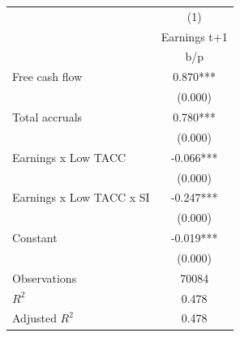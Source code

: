 {
\def\sym#1{\ifmmode^{#1}\else\(^{#1}\)\fi}
\begin{tabular}{l*{1}{c}}
\hline\hline
                    &\multicolumn{1}{c}{(1)}\\
                    &\multicolumn{1}{c}{Earnings t+1}\\
                    &         b/p   \\
\hline
Free cash flow      &       0.870***\\
                    &     (0.000)   \\
Total accruals      &       0.780***\\
                    &     (0.000)   \\
Earnings x Low TACC &      -0.066***\\
                    &     (0.000)   \\
Earnings x Low TACC x SI&      -0.247***\\
                    &     (0.000)   \\
Constant            &      -0.019***\\
                    &     (0.000)   \\
\hline
Observations        &       70084   \\
\(R^{2}\)           &       0.478   \\
Adjusted \(R^{2}\)  &       0.478   \\
\hline\hline
\end{tabular}
}
